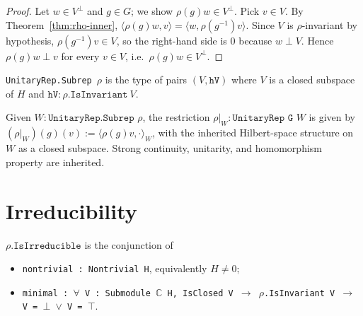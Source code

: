 \begin{proof}
  Let $w \in V^\perp$ and $g \in G$; we show $\rho(g) w \in V^\perp$.
  Pick $v \in V$. By Theorem~\ref{thm:rho-inner},
  $\langle \rho(g) w, v\rangle
    = \langle w, \rho(g^{-1}) v\rangle$.
  Since $V$ is $\rho$-invariant by hypothesis,
  $\rho(g^{-1}) v \in V$, so the right-hand side is $0$ because
  $w \perp V$. Hence $\rho(g)w \perp v$ for every $v \in V$, i.e.\
  $\rho(g)w \in V^\perp$.
\end{proof}

\begin{definition}
  \label{def:Subrep}
  \leanok
  \texttt{UnitaryRep.Subrep $\rho$} is the type of pairs
  $(V, \texttt{hV})$ where $V$ is a closed subspace of $H$ and
  $\texttt{hV} : \rho.\texttt{IsInvariant}\ V$.
\end{definition}

\begin{definition}
  \label{def:restrict}
  \leanok
  Given $W : \texttt{UnitaryRep.Subrep $\rho$}$, the restriction
  $\rho|_W : \texttt{UnitaryRep G $W$}$ is given by
  $(\rho|_W)(g)(v) := \langle \rho(g) v, \cdot\rangle_W$, with the
  inherited Hilbert-space structure on $W$ as a closed subspace.
  Strong continuity, unitarity, and homomorphism property are inherited.
\end{definition}

\section{Irreducibility}

\begin{definition}
  \label{def:IsIrreducible}
  \leanok
  $\rho.\texttt{IsIrreducible}$ is the conjunction of
  \begin{itemize}
    \item \texttt{nontrivial : Nontrivial H}, equivalently $H \neq 0$;
    \item \texttt{minimal : $\forall$ V : Submodule $\mathbb C$ H,
      IsClosed V $\to$ $\rho$.IsInvariant V $\to$ V = $\bot$ $\vee$ V = $\top$}.
  \end{itemize}
\end{definition}



